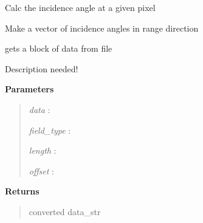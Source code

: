 \documentclass[letterpaper,10pt,english]{sphinxmanual}
\begin{document}
\begin{fulllineitems}
\label{code:Metadata.getThetaPixel}
Calc the incidence angle at a given pixel

\end{fulllineitems}


\begin{fulllineitems}
\label{code:Metadata.getThetaVector}
Make a vector of incidence angles in range direction

\end{fulllineitems}


\begin{fulllineitems}
\label{code:Metadata.get_data_block}
gets a block of data from file

\end{fulllineitems}


\begin{fulllineitems}
\label{code:Metadata.get_field_value}
Description needed!

\textbf{Parameters}
\begin{quote}

\emph{data}       :

\emph{field\_type} :

\emph{length}     :

\emph{offset}     :
\end{quote}

\textbf{Returns}
\begin{quote}

converted data\_str
\end{quote}

\end{fulllineitems}

\end{document}

